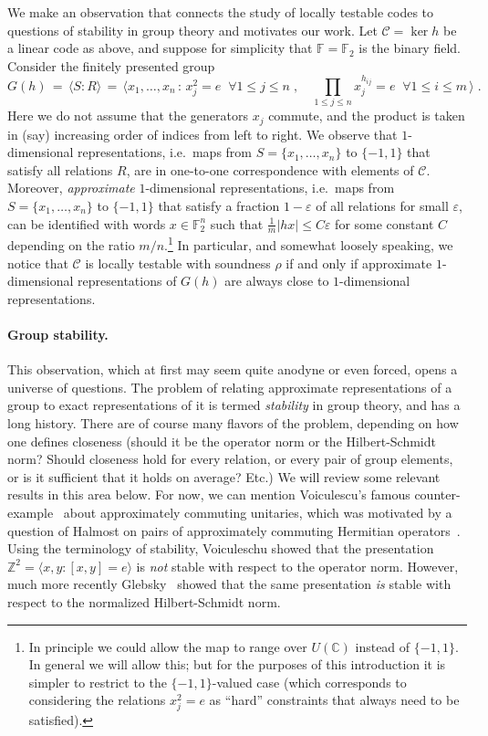 \documentclass[11pt]{article}
\theoremstyle{definition}
\newcommand{\code}{\mathscr{C}}
\newcommand{\C}{\ensuremath{\mathbb{C}}}
\newcommand{\F}{\ensuremath{\mathbb{F}}}
\newcommand{\Z}{\ensuremath{\mathbb{Z}}}
\newcommand{\eps}{\varepsilon}
\begin{document}
We make an observation that connects the study of locally testable codes to questions of stability in group theory and motivates our work. Let $\code=\ker h$ be a linear code as above, and suppose for simplicity that $\F=\F_2$ is the binary field. Consider the finitely presented group 
\begin{equation}\label{eq:gh-intro}
 G(h) \,=\, \langle S:R\rangle \,=\, \big\langle x_1,\ldots,x_n \,:\, x_j^2=e\;\; \forall 1\leq j\leq n\;,\quad \prod_{1\leq j \leq n} x_j^{h_{ij}} = e \;\; \forall 1\leq i\leq m\,\big\rangle\;.
\end{equation}
Here we do not assume that the generators $x_j$ commute, and the product is taken in (say) increasing order of indices from left to right. We observe that $1$-dimensional representations, i.e.\ maps from $S=\{x_1,\ldots,x_n\}$ to $\{-1,1\}$ that satisfy all relations $R$, are in one-to-one correspondence with elements of $\code$. Moreover, \emph{approximate} $1$-dimensional representations, i.e.\ maps from  $S=\{x_1,\ldots,x_n\}$ to $\{-1,1\}$ that satisfy a fraction $1-\eps$ of all relations for small $\eps$, can be identified with words $x\in\F_2^n$ such that $\frac{1}{m}|hx|\leq C\eps$ for some constant $C$ depending on the ratio $m/n$.\footnote{In principle we could allow the map to range over $U(\C)$ instead of $\{-1,1\}$. In general we will allow this; but for the purposes of this introduction it is simpler to restrict to the $\{-1,1\}$-valued case (which corresponds to considering the relations $x_j^2=e$ as ``hard'' constraints that always need to be satisfied).} In particular, and somewhat loosely speaking, we notice that $\code$ is locally testable with soundness $\rho$ if and only if approximate $1$-dimensional representations of $G(h)$ are always close to $1$-dimensional representations. 

\paragraph{Group stability.}
This observation,  which at first may seem quite anodyne or even forced, opens a universe of questions. The problem of relating approximate representations of a group to exact representations of it is termed \emph{stability} in group theory, and has a long history. There are of course many flavors of the problem, depending on how one defines closeness (should it be the operator norm or the Hilbert-Schmidt norm? Should closeness hold for every relation, or every pair of group elements, or is it sufficient that it holds on average? Etc.) We will review some relevant results in this area below. For now, we can mention Voiculescu's famous counter-example~\cite{voiculescu1983asymptotically} about approximately commuting unitaries, which was motivated by a question of Halmost on pairs of approximately commuting Hermitian operators~\cite{halmos1976some}. Using the terminology of stability, Voiculeschu showed that the presentation $\Z^2 = \langle x,y:[x,y]=e\rangle$ is \emph{not} stable with respect to the operator norm. However, much more recently Glebsky~\cite{glebsky2010almost} showed that the same presentation \emph{is} stable with respect to the normalized Hilbert-Schmidt norm. 
\end{document}
